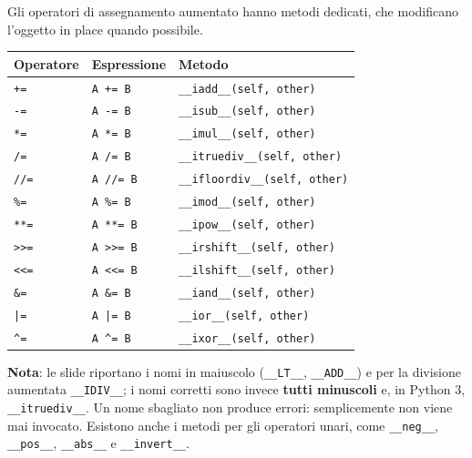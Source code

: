 \documentclass[12pt]{extarticle}
\begin{document}
\noindent Gli operatori di assegnamento aumentato hanno metodi dedicati, che modificano l'oggetto in place quando possibile.

\begin{center}
\small
\begin{tabular}{p{2.0cm}p{3.2cm}p{5.4cm}}
    \toprule
    \textbf{Operatore} & \textbf{Espressione} & \textbf{Metodo} \\
    \midrule
    \texttt{+=} & \texttt{A += B} & \texttt{\_\_iadd\_\_(self, other)} \\
    \addlinespace
    \texttt{-=} & \texttt{A -= B} & \texttt{\_\_isub\_\_(self, other)} \\
    \addlinespace
    \texttt{*=} & \texttt{A *= B} & \texttt{\_\_imul\_\_(self, other)} \\
    \addlinespace
    \texttt{/=} & \texttt{A /= B} & \texttt{\_\_itruediv\_\_(self, other)} \\
    \addlinespace
    \texttt{//=} & \texttt{A //= B} & \texttt{\_\_ifloordiv\_\_(self, other)} \\
    \addlinespace
    \texttt{\%=} & \texttt{A \%= B} & \texttt{\_\_imod\_\_(self, other)} \\
    \addlinespace
    \texttt{**=} & \texttt{A **= B} & \texttt{\_\_ipow\_\_(self, other)} \\
    \addlinespace
    \texttt{>>=} & \texttt{A >>= B} & \texttt{\_\_irshift\_\_(self, other)} \\
    \addlinespace
    \texttt{<<=} & \texttt{A <<= B} & \texttt{\_\_ilshift\_\_(self, other)} \\
    \addlinespace
    \texttt{\&=} & \texttt{A \&= B} & \texttt{\_\_iand\_\_(self, other)} \\
    \addlinespace
    \texttt{|=} & \texttt{A |= B} & \texttt{\_\_ior\_\_(self, other)} \\
    \addlinespace
    \texttt{\^{}=} & \texttt{A \^{}= B} & \texttt{\_\_ixor\_\_(self, other)} \\
    \bottomrule
\end{tabular}
\end{center}

\noindent \textbf{Nota}: le slide riportano i nomi in maiuscolo (\texttt{\_\_LT\_\_}, \texttt{\_\_ADD\_\_}) e per la divisione aumentata \texttt{\_\_IDIV\_\_}; i nomi corretti sono invece \textbf{tutti minuscoli} e, in Python 3, \texttt{\_\_itruediv\_\_}. Un nome sbagliato non produce errori: semplicemente non viene mai invocato. Esistono anche i metodi per gli operatori unari, come \texttt{\_\_neg\_\_}, \texttt{\_\_pos\_\_}, \texttt{\_\_abs\_\_} e \texttt{\_\_invert\_\_}.
\end{document}
